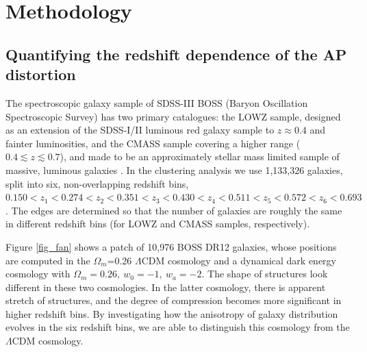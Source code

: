 \documentclass[iop]{emulateapj}
\begin{document}



\section{Methodology}

\subsection{Quantifying the redshift dependence of the AP distortion}

The spectroscopic galaxy sample of SDSS-III BOSS (Baryon Oscillation Spectroscopic Survey) has two primary catalogues:
the LOWZ sample, designed as an extension of the SDSS-I/II luminous red galaxy sample to $z\approx 0.4$ and fainter luminosities,
and the CMASS sample covering a higher range ($0.4\lesssim z \lesssim 0.7$),
and made to be an approximately stellar mass limited sample of massive, luminous galaxies \citep{Reidetal:2016}.
In the clustering analysis we use 1,133,326 galaxies, split into six, non-overlapping redshift bins, 
$0.150<z_1<0.274<z_2<0.351<z_3<0.430<z_4<0.511<z_5<0.572<z_6<0.693$.
The edges are determined so that the number of galaxies are roughly the same in different redshift bins 
(for LOWZ and CMASS samples, respectively).


Figure \ref{fig_fan} shows a patch of 10,976 BOSS DR12 galaxies,
whose positions are computed in the $\Omega_m$=0.26 $\Lambda$CDM cosmology 
and a dynamical dark energy cosmology with $\Omega_m=0.26,\ w_0=-1,\ w_a=-2$.
The shape of structures look different in these two cosmologies. 
In the latter cosmology, there is apparent stretch of structures, 
and the degree of compression becomes more significant in higher redshift bins.
By investigating how the anisotropy of galaxy distribution evolves in the six redshift bins,
we are able to distinguish this cosmology from the $\Lambda$CDM cosmology.
\end{document}
